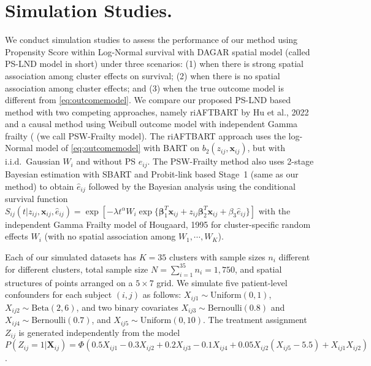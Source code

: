 \documentclass[aoas]{imsart}
\theoremstyle{plain}
\theoremstyle{definition}
\begin{document}





\section{Simulation Studies.}
We conduct simulation studies to assess the performance of our method using Propensity Score within Log-Normal survival with DAGAR spatial model (called PS-LND model in short)  under three scenarios: (1) when there is strong spatial association among cluster effects on survival; (2) when there is no spatial association among cluster effects; and (3) when the true outcome model is different from \eqref{eq:outcomemodel}. We compare our proposed PS-LND based method with two competing approaches, namely riAFTBART by Hu et al., 2022 \parencite{Hu2022clusteredsurvival} and a causal method using Weibull outcome model with independent Gamma frailty (\parencite{Hougaard1995survival} (we call  PSW-Frailty model). The riAFTBART approach uses the log-Normal model of 
\eqref{eq:outcomemodel} with  BART on $b_2(z_{ij},\mathbf{x}_{ij})$, but with i.i.d.\ Gaussian $W_i$ and without PS $e_{ij}$. The PSW-Frailty method also uses 2-stage Bayesian estimation 
with SBART and Probit-link based Stage~1 (same as our method) to obtain  $\hat{e}_{ij}$ followed by the Bayesian analysis using  the conditional survival function  $S_{ij}(t|z_{ij},\mathbf{x}_{ij},\hat{e}_{ij} ) = \exp[-\lambda t^{\alpha}W_i\exp\{\boldsymbol{\beta}_1^T\mathbf{x}_{ij} + z_{ij}\boldsymbol{\beta}_2^T\mathbf{x}_{ij} + \beta_3 \hat{e}_{ij} \}]$ with the independent Gamma Frailty model of Hougaard, 1995 \parencite{Hougaard1995survival} 
for cluster-specific random effects $W_i$ (with no spatial association among $W_1,\cdots,W_K$).


Each of our simulated datasets has $K = 35$ clusters with sample sizes $n_i$ different for different clusters, total sample size $N = \sum_{i=1}^{35}n_i=1,750$, and spatial structures of points arranged on a $5 \times 7$ grid. We simulate five patient-level confounders for each subject $(i,j)$ as follows: $X_{ij1}\sim\text{Uniform}(0,1)$, $X_{ij2}\sim\text{Beta}(2,6)$, and two binary covariates $X_{ij3}\sim \text{Bernoulli}(0.8)$ and $X_{ij4}\sim\text{Bernoulli}(0.7)$, and $X_{ij5}\sim \text{Uniform}(0,10)$. 
The treatment assignment $Z_{ij}$ is generated independently from the  model $P(Z_{ij} = 1 | \mathbf{X}_{ij}) = \Phi(0.5X_{ij1} - 0.3X_{ij2} + 0.2X_{ij3} - 0.1X_{ij4} + 0.05X_{ij2}(X_{ij5} - 5.5) + X_{ij1}X_{ij2})$. 
\end{document}
